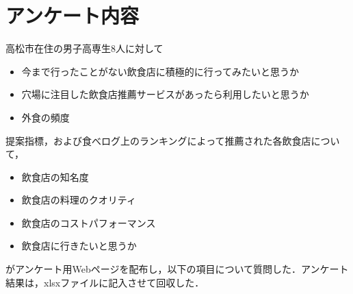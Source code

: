 \section{アンケート内容}\label{exp:questionnaire}

		高松市在住の男子高専生8人に対して
		\begin{itemize}
			\item 今まで行ったことがない飲食店に積極的に行ってみたいと思うか
			\item 穴場に注目した飲食店推薦サービスがあったら利用したいと思うか
			\item 外食の頻度
		\end{itemize}
		提案指標，および食べログ上のランキングによって推薦された各飲食店について，
		\begin{itemize}
			\item 飲食店の知名度
			\item 飲食店の料理のクオリティ
			\item 飲食店のコストパフォーマンス
			\item 飲食店に行きたいと思うか
		\end{itemize}
		がアンケート用Webページを配布し，以下の項目について質問した．アンケート結果は，xlsxファイルに記入させて回収した．


